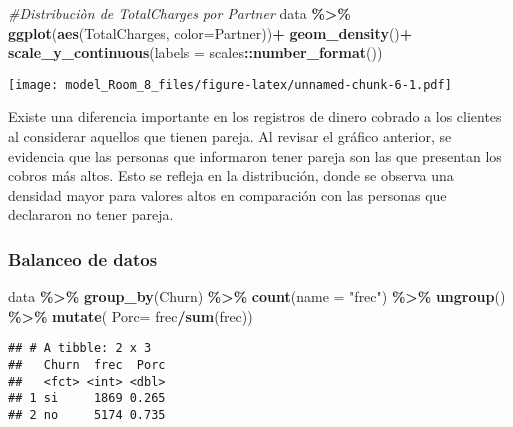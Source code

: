\documentclass[
]{article}
\newenvironment{Shaded}{\begin{snugshade}}{\end{snugshade}}
\newcommand{\AttributeTok}[1]{\textcolor[rgb]{0.13,0.29,0.53}{#1}}
\newcommand{\CommentTok}[1]{\textcolor[rgb]{0.56,0.35,0.01}{\textit{#1}}}
\newcommand{\FunctionTok}[1]{\textcolor[rgb]{0.13,0.29,0.53}{\textbf{#1}}}
\newcommand{\NormalTok}[1]{#1}
\newcommand{\SpecialCharTok}[1]{\textcolor[rgb]{0.81,0.36,0.00}{\textbf{#1}}}
\newcommand{\StringTok}[1]{\textcolor[rgb]{0.31,0.60,0.02}{#1}}
\begin{document}
\begin{Shaded}
\begin{Highlighting}[]
\CommentTok{\#Distribuciòn de TotalCharges por Partner}
\NormalTok{data }\SpecialCharTok{\%\textgreater{}\%} 
        \FunctionTok{ggplot}\NormalTok{(}\FunctionTok{aes}\NormalTok{(TotalCharges,}
                   \AttributeTok{color=}\NormalTok{Partner))}\SpecialCharTok{+}
        \FunctionTok{geom\_density}\NormalTok{()}\SpecialCharTok{+}
        \FunctionTok{scale\_y\_continuous}\NormalTok{(}\AttributeTok{labels =}\NormalTok{ scales}\SpecialCharTok{::}\FunctionTok{number\_format}\NormalTok{())}
\end{Highlighting}
\end{Shaded}

\texttt{[image: model\_Room\_8\_files/figure-latex/unnamed-chunk-6-1.pdf]}

Existe una diferencia importante en los registros de dinero cobrado a
los clientes al considerar aquellos que tienen pareja. Al revisar el
gráfico anterior, se evidencia que las personas que informaron tener
pareja son las que presentan los cobros más altos. Esto se refleja en la
distribución, donde se observa una densidad mayor para valores altos en
comparación con las personas que declararon no tener pareja.

\hypertarget{balanceo-de-datos}{%
\subsubsection{Balanceo de datos}\label{balanceo-de-datos}}

\begin{Shaded}
\begin{Highlighting}[]
\NormalTok{data }\SpecialCharTok{\%\textgreater{}\%} 
  \FunctionTok{group\_by}\NormalTok{(Churn) }\SpecialCharTok{\%\textgreater{}\%} 
  \FunctionTok{count}\NormalTok{(}\AttributeTok{name =} \StringTok{"frec"}\NormalTok{) }\SpecialCharTok{\%\textgreater{}\%}
\FunctionTok{ungroup}\NormalTok{() }\SpecialCharTok{\%\textgreater{}\%}
\FunctionTok{mutate}\NormalTok{( }\AttributeTok{Porc=}\NormalTok{ frec}\SpecialCharTok{/}\FunctionTok{sum}\NormalTok{(frec))}
\end{Highlighting}
\end{Shaded}

\begin{verbatim}
## # A tibble: 2 x 3
##   Churn  frec  Porc
##   <fct> <int> <dbl>
## 1 si     1869 0.265
## 2 no     5174 0.735
\end{verbatim}
\end{document}
